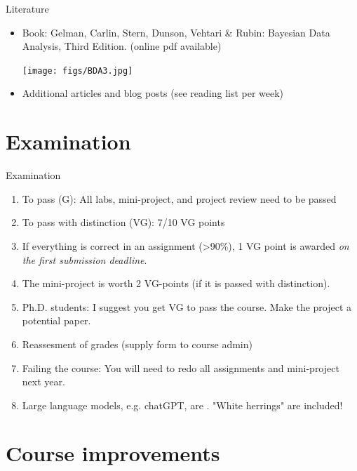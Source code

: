 \documentclass[10pt]{beamer}
\begin{document}
\begin{frame}{Literature}

\begin{itemize}
  \item Book: Gelman, Carlin, Stern, Dunson, Vehtari \& Rubin: Bayesian Data Analysis, Third Edition. {\footnotesize (online pdf available)}
  \begin{center}
    \texttt{[image: figs/BDA3.jpg]}
  \end{center}
  \item Additional articles and blog posts (see reading list per week)
\end{itemize}

\end{frame}

\section{Examination}
\frame{\sectionpage}


\begin{frame}{Examination}

\begin{enumerate}
\item To pass (G): All labs, mini-project, and project review need to be passed\pause
\item To pass with distinction (VG): 7/10 VG points\pause
\item If everything is correct in an assignment (>90\%), 1 VG point is awarded \emph{on the first submission deadline}.\pause
\item The mini-project is worth 2 VG-points (if it is passed with distinction).
\item Ph.D. students: I suggest you get VG to pass the course. Make the project a potential paper.
\item Reassesment of grades (supply form to course admin)
\item Failing the course: You will need to redo all assignments and mini-project next year.
\item Large language models, e.g. chatGPT, are . "White herrings" are included!
\end{enumerate}

\end{frame}

\section{Course improvements}
\frame{\sectionpage}
\end{document}
